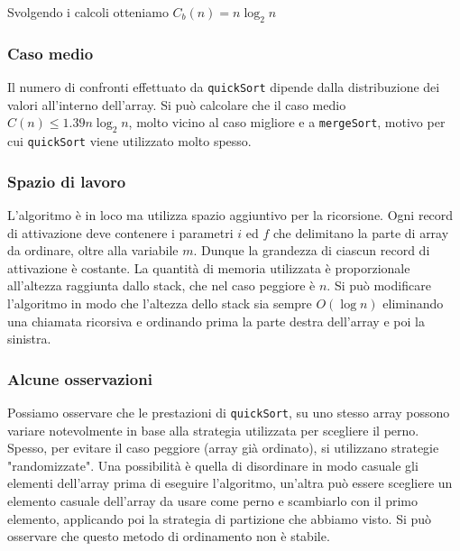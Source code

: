\noindent Svolgendo i calcoli otteniamo $C_{b}(n) = n \log_2 n$

\subsubsection*{Caso medio}
Il numero di confronti effettuato da {\texttt{quickSort}} dipende dalla distribuzione
dei valori all'interno dell'array. Si può calcolare che il caso medio $C(n) \le 1.39n \log_2 n$, 
molto vicino al caso migliore e a {\texttt{mergeSort}}, motivo per cui {\texttt{quickSort}}
viene utilizzato molto spesso. 

\subsubsection*{Spazio di lavoro}
L'algoritmo è in loco ma utilizza spazio aggiuntivo per la ricorsione. Ogni 
record di attivazione deve contenere i parametri $i$ ed $f$ che delimitano
la parte di array da ordinare, oltre alla variabile $m$. Dunque la grandezza
di ciascun record di attivazione è costante. La quantità di memoria utilizzata 
è proporzionale all'altezza raggiunta dallo stack, che nel caso peggiore è $n$.
Si può modificare
l'algoritmo in modo che l'altezza dello stack sia sempre $O(\log n)$ eliminando una chiamata
ricorsiva e ordinando prima la parte destra dell'array e poi la sinistra.

\subsubsection*{Alcune osservazioni}
Possiamo osservare che le prestazioni di {\texttt{quickSort}}, su uno stesso array
possono variare notevolmente in base alla strategia utilizzata per scegliere il perno.
Spesso, per evitare il caso peggiore (array già ordinato), si utilizzano strategie
"randomizzate". Una possibilità è quella di disordinare in modo casuale gli
elementi dell'array prima di eseguire l'algoritmo, un'altra può essere
scegliere un elemento casuale dell'array da usare come perno e scambiarlo con il 
primo elemento, applicando poi la strategia di partizione che abbiamo visto.
Si può osservare che questo metodo di ordinamento non è stabile. 
\clearpage